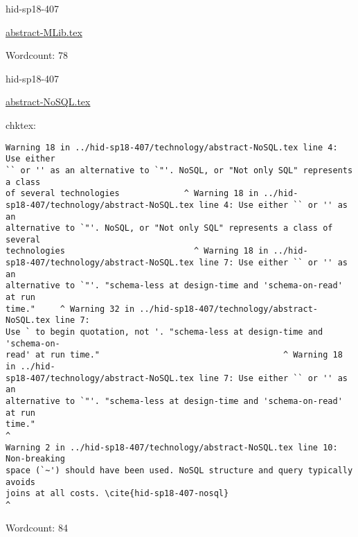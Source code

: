 

\begin{IU}

hid-sp18-407

\href{https://github.com/cloudmesh-community/hid-sp18-407/blob/master//technology/abstract-MLib.tex}{abstract-MLib.tex}

 

Wordcount: 78

\end{IU}



\begin{IU}

hid-sp18-407

\href{https://github.com/cloudmesh-community/hid-sp18-407/blob/master//technology/abstract-NoSQL.tex}{abstract-NoSQL.tex}

 
chktex:
\begin{tiny}
\begin{verbatim}
Warning 18 in ../hid-sp18-407/technology/abstract-NoSQL.tex line 4: Use either
`` or '' as an alternative to `"'. NoSQL, or "Not only SQL" represents a class
of several technologies             ^ Warning 18 in ../hid-
sp18-407/technology/abstract-NoSQL.tex line 4: Use either `` or '' as an
alternative to `"'. NoSQL, or "Not only SQL" represents a class of several
technologies                          ^ Warning 18 in ../hid-
sp18-407/technology/abstract-NoSQL.tex line 7: Use either `` or '' as an
alternative to `"'. "schema-less at design-time and 'schema-on-read' at run
time."     ^ Warning 32 in ../hid-sp18-407/technology/abstract-NoSQL.tex line 7:
Use ` to begin quotation, not '. "schema-less at design-time and 'schema-on-
read' at run time."                                     ^ Warning 18 in ../hid-
sp18-407/technology/abstract-NoSQL.tex line 7: Use either `` or '' as an
alternative to `"'. "schema-less at design-time and 'schema-on-read' at run
time."                                                                  ^
Warning 2 in ../hid-sp18-407/technology/abstract-NoSQL.tex line 10: Non-breaking
space (`~') should have been used. NoSQL structure and query typically avoids
joins at all costs. \cite{hid-sp18-407-nosql}
^
\end{verbatim}
\end{tiny}

Wordcount: 84

\end{IU}

